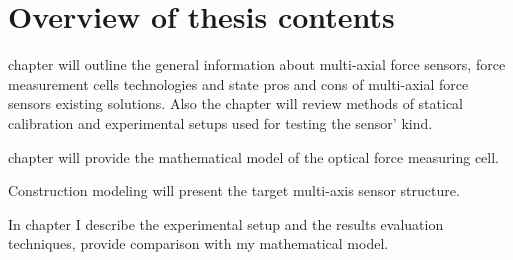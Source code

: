 


\section{Overview of thesis contents}

 chapter will outline the general information about multi-axial force sensors, force measurement cells technologies and state pros and cons of multi-axial force sensors existing solutions. 
Also the chapter will review methods of statical calibration and experimental setups used for testing the sensor' kind.

 chapter will provide the mathematical model of the optical force measuring cell.

Construction modeling will present the target multi-axis sensor structure.

In  chapter I describe the experimental setup and the results evaluation techniques, provide comparison with my mathematical model.




